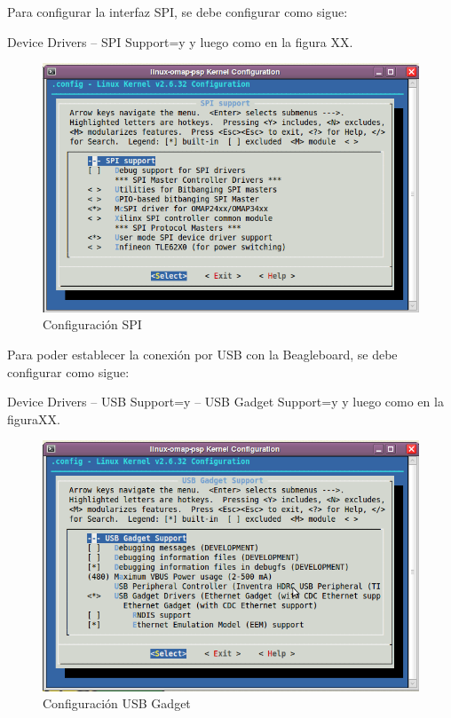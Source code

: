 Para configurar la interfaz SPI, se debe configurar como sigue:

Device Drivers – SPI Support=y y luego como en la figura XX.

\begin{figure}[H]
\centering
  \begin{center}
  \includegraphics[scale=.4]{Imagenes/spi_chica.png} 
  \end{center}
  \caption{Configuración SPI}\label{Fig:HW} 
\end{figure}


Para poder establecer la conexión por USB con la Beagleboard, se debe configurar como sigue: 

Device Drivers – USB Support=y – USB Gadget Support=y y luego como en la figuraXX.

\begin{figure}[H]
\centering
  \begin{center}
  \includegraphics[scale=.4]{Imagenes/usb_chica.png} 
  \end{center}
  \caption{Configuración USB Gadget}\label{Fig:HW} 
\end{figure}

